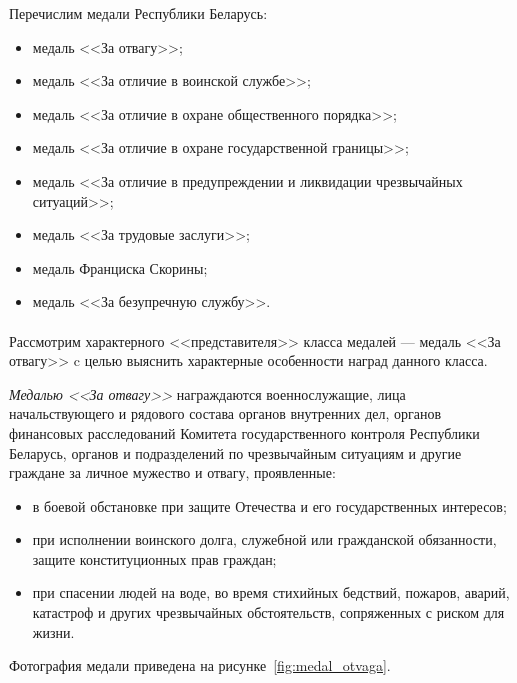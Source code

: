 Перечислим медали Республики Беларусь:
\begin{itemize}
\item медаль <<За отвагу>>;
\item медаль <<За отличие в воинской службе>>;
\item медаль <<За отличие в охране общественного порядка>>;
\item медаль <<За отличие в охране государственной границы>>;
\item медаль <<За отличие в предупреждении и ликвидации чрезвычайных ситуаций>>;
\item медаль <<За трудовые заслуги>>;
\item медаль Франциска Скорины;
\item медаль <<За безупречную службу>>.
\end{itemize}


\paragraph{}
Рассмотрим характерного <<представителя>> класса 
медалей --- медаль <<За отвагу>> c целью выяснить 
характерные особенности наград данного класса.

\textit{Медалью <<За отвагу>>} награждаются военнослужащие, 
лица начальствующего и рядового состава органов внутренних дел,
органов финансовых расследований Комитета государственного контроля
Республики Беларусь, органов и подразделений по чрезвычайным ситуациям
и другие граждане за личное мужество и отвагу, проявленные: 

\begin{itemize}
\item
  в боевой обстановке при защите Отечества и его государственных интересов; 
\item
  при исполнении воинского долга, служебной или гражданской обязанности,
  защите конституционных прав граждан; 
\item
  при спасении людей на воде, во время стихийных бедствий, пожаров, аварий,
  катастроф и других чрезвычайных обстоятельств, сопряженных с риском для жизни. 
\end{itemize}

Фотография медали приведена на рисунке~\ref{fig:medal_otvaga}.

